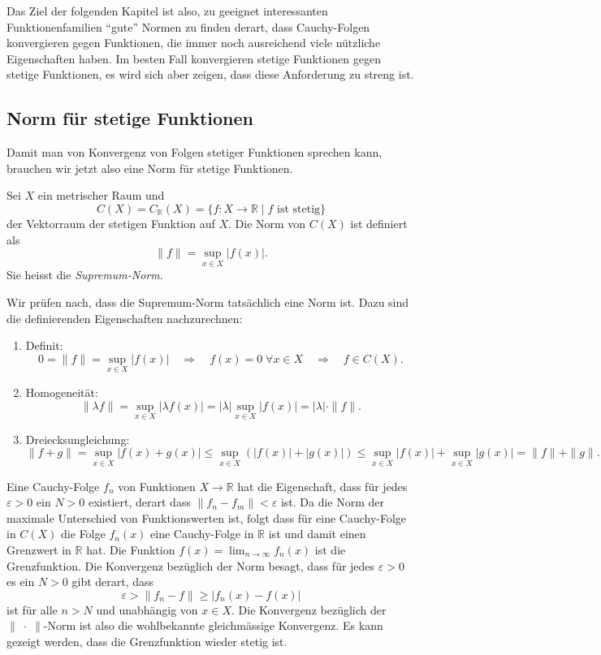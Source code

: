 Das Ziel der folgenden Kapitel ist also, zu geeignet interessanten
Funktionenfamilien ``gute'' Normen zu finden derart, dass Cauchy-Folgen
konvergieren gegen Funktionen, die immer noch ausreichend viele
nützliche Eigenschaften haben.
Im besten Fall konvergieren stetige Funktionen gegen stetige Funktionen,
es wird sich aber zeigen, dass diese Anforderung zu streng ist.

%
%
\subsection{Norm für stetige Funktionen
\label{buch:skalarprodukt:subsection:normfuerstetigefunktionen}}
Damit man von Konvergenz von Folgen stetiger Funktionen sprechen kann,
brauchen wir jetzt also eine Norm für stetige Funktionen.

\begin{definition}
Sei $X$ ein metrischer Raum und
\[
C(X)
=
C_{\mathbb{R}}(X)
=
\{
f\colon X \to\mathbb{R}\mid
\text{$f$ ist stetig}
\}
\]
der Vektorraum der stetigen Funktion auf $X$.
Die Norm von $C(X)$ ist definiert als
\[
\|f\| = \sup_{x\in X} |f(x)|.
\]
Sie heisst die {\em Supremum-Norm}.
\end{definition}

Wir prüfen nach, dass die Supremum-Norm tatsächlich eine Norm ist.
Dazu sind die definierenden Eigenschaften nachzurechnen:
\begin{enumerate}
\item Definit: 
\[
0
=
\|f\|
=
\sup_{x\in X} |f(x)|
\quad\Rightarrow\quad
f(x)=0 \;\forall x\in X
\quad\Rightarrow\quad
f\in C(X).
\]
\item Homogeneität:
\[
\|\lambda f\|
=
\sup_{x\in X} |\lambda f(x)|
=
|\lambda| \sup_{x\in X} |f(x)|
=
|\lambda| \cdot \|f\|.
\]
\item
Dreiecksungleichung:
\[
\|f+g\|
=
\sup_{x\in X}|f(x)+g(x)|
\le
\sup_{x\in X}(|f(x)|+|g(x)|)
\le
\sup_{x\in X}|f(x)|+\sup_{x\in X}|g(x)|
=
\|f\| + \|g\|.
\]
\end{enumerate}

Eine Cauchy-Folge $f_n$ von Funktionen $X\to \mathbb{R}$ hat die
Eigenschaft, dass für jedes $\varepsilon >0$ ein $N>0$ existiert,
derart dass $\|f_n-f_m\|<\varepsilon$ ist.
Da die Norm der maximale Unterschied von Funktionswerten ist,
folgt dass für eine Cauchy-Folge in $C(X)$ die Folge $f_n(x)$ eine
Cauchy-Folge in $\mathbb{R}$ ist und damit einen Grenzwert in $\mathbb{R}$
hat.
Die Funktion $f(x) = \lim_{n\to\infty}f_n(x)$ ist die Grenzfunktion.
Die Konvergenz bezüglich der Norm besagt, dass für jedes $\varepsilon>0$
es ein $N>0$ gibt derart, dass
\[
\varepsilon 
>
\|f_n-f\|
\ge 
|f_n(x)-f(x)|
\]
ist für alle $n>N$ und unabhängig von $x\in X$.
Die Konvergenz bezüglich der $\|\;\cdot\;\|$-Norm ist also die wohlbekannte
gleichmässige Konvergenz.
Es kann gezeigt werden, dass die Grenzfunktion wieder stetig ist.

